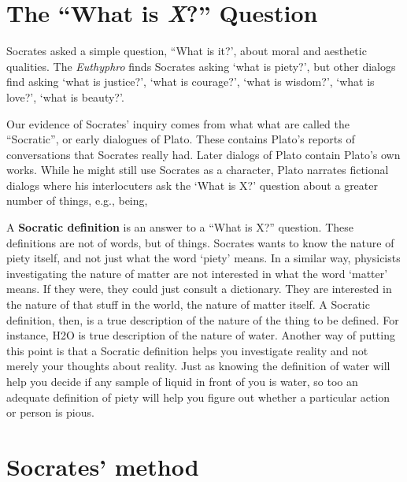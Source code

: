 \documentclass[10 pt]{article}
\begin{document}

%

\section*{The ``What is \emph{X}?'' Question}

Socrates asked a simple question, ``What is it?', about moral and aesthetic qualities. The \emph{Euthyphro} finds Socrates asking `what is piety?', but other dialogs find asking `what is justice?', `what is courage?', `what is wisdom?', `what is love?', `what is beauty?'. 

Our evidence of Socrates' inquiry comes from what what are called the  ``Socratic'', or early dialogues of Plato. These contains Plato's reports of conversations that Socrates really had. Later dialogs of Plato contain Plato's own works. While he might still use Socrates as a character, Plato narrates fictional dialogs where his interlocuters ask the `What is X?' question about a greater number of things, e.g., being, 

A \textbf{Socratic definition} is an answer to a ``What is X?'' question. These definitions are not of words, but of things. Socrates wants to know the nature of piety itself, and not just what the word `piety' means. In a similar way, physicists investigating the nature of matter are not interested in what the word `matter' means. If they were, they could just consult a dictionary. They are interested in the nature of that stuff in the world, the nature of matter itself.  A Socratic definition, then, is a true description of the nature of the thing to be defined. For instance, H2O is true description of the nature of water. Another way of putting this point is that a Socratic definition helps you investigate reality and not merely your thoughts about reality. Just as knowing the definition of water will help you decide if any sample of liquid in front of you is water, so too an adequate definition of piety will help you figure out whether a particular action or person is pious. 


\section*{Socrates' method}
\end{document}
